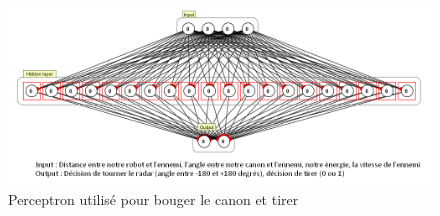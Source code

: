 \documentclass[a4paper,11pt]{article}
\begin{document}
\begin{figure}[!h]
\centering
\includegraphics{images/tir_network.png}
\caption{Perceptron utilisé pour bouger le canon et tirer}
\label{canon_perceptron}
\end{figure}


\newpage


\printbibliography
\end{document}
